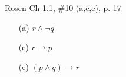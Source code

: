 \documentclass[12pt]{exam}
\begin{document}
\begin{questions}
\question[6] Rosen Ch 1.1, \#10 (a,c,e), p. 17
    \begin{solution}
        \begin{itemize}
        \item[(a)] $r \wedge \neg q$
        \item[(c)] $r \rightarrow p$
        \item[(e)] $(p \wedge q) \rightarrow r$
        \end{itemize}
    \end{solution}


\end{questions}
\end{document}

